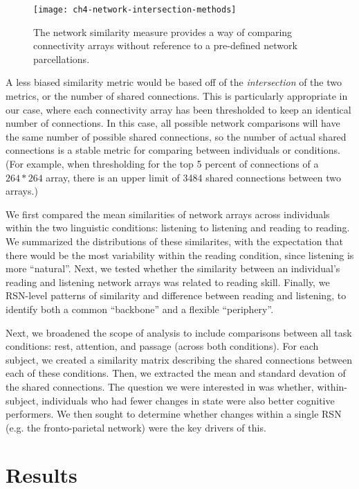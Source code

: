 \begin{figure}[t]
	\centering
	\texttt{[image: ch4-network-intersection-methods]}
    \caption[Method for comparing connectivity arrays.]{The network similarity measure provides a way of comparing connectivity arrays without reference to a pre-defined network parcellations.}
	\label{fig:ch4-network-intersection-methods}
\end{figure}

A less biased similarity metric would be based off of the \textit{intersection} of the two metrics, or the number of shared connections. This is particularly appropriate in our case, where each connectivity array has been thresholded to keep an identical number of connections. In this case, all possible network comparisons will have the same number of possible shared connections, so the number of actual shared connections is a stable metric for comparing between individuals or conditions. (For example, when thresholding for the top 5 percent of connections of a $264 * 264$ array, there is an upper limit of 3484 shared connections between two arrays.) 

We first compared the mean similarities of network arrays across individuals within the two linguistic conditions: listening to listening and reading to reading. We summarized the distributions of these similarites, with the expectation that there would be the most variability within the reading condition, since listening is more ``natural''. Next, we tested whether the similarity between an individual's reading and listening network arrays was related to reading skill. Finally, we RSN-level patterns of similarity and difference between reading and listening, to identify both a common ``backbone'' and a flexible ``periphery''. 

Next, we broadened the scope of analysis to include comparisons between all task conditions: rest, attention, and passage (across both conditions). For each subject, we created a similarity matrix describing the shared connections between each of these conditions. Then, we extracted the mean and standard devation of the shared connections. The question we were interested in was whether, within-subject, individuals who had fewer changes in state were also better cognitive performers. We then sought to determine whether changes within a single RSN (e.g. the fronto-parietal network) were the key drivers of this. 

\section{Results}

